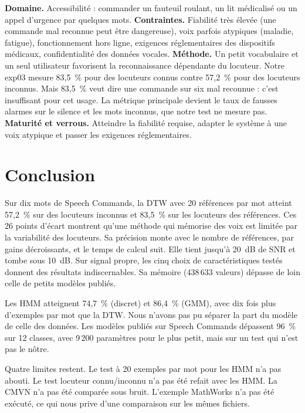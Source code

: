 \textbf{Domaine.} Accessibilité : commander un fauteuil roulant, un lit médicalisé ou un appel d'urgence par quelques mots. \textbf{Contraintes.} Fiabilité très élevée (une commande mal reconnue peut être dangereuse), voix parfois atypiques (maladie, fatigue), fonctionnement hors ligne, exigences réglementaires des dispositifs médicaux, confidentialité des données vocales. \textbf{Méthode.} Un petit vocabulaire et un seul utilisateur favorisent la reconnaissance dépendante du locuteur. Notre exp03 mesure 83,5~\% pour des locuteurs connus contre 57,2~\% pour des locuteurs inconnus. Mais 83,5~\% veut dire une commande sur six mal reconnue : c'est insuffisant pour cet usage. La métrique principale devient le taux de fausses alarmes sur le silence et les mots inconnus, que notre test ne mesure pas. \textbf{Maturité et verrous.} Atteindre la fiabilité requise, adapter le système à une voix atypique et passer les exigences réglementaires.

\section{Conclusion}

Sur dix mots de Speech Commands, la DTW avec 20 références par mot atteint 57,2~\% sur des locuteurs inconnus et 83,5~\% sur les locuteurs des références. Ces 26 points d'écart montrent qu'une méthode qui mémorise des voix est limitée par la variabilité des locuteurs. Sa précision monte avec le nombre de références, par gains décroissants, et le temps de calcul suit. Elle tient jusqu'à 20~dB de SNR et tombe sous 10~dB. Sur signal propre, les cinq choix de caractéristiques testés donnent des résultats indiscernables. Sa mémoire (438\,633 valeurs) dépasse de loin celle de petits modèles publiés.

Les HMM atteignent 74,7~\% (discret) et 86,4~\% (GMM), avec dix fois plus d'exemples par mot que la DTW. Nous n'avons pas pu séparer la part du modèle de celle des données. Les modèles publiés sur Speech Commands dépassent 96~\% sur 12 classes, avec 9\,200 paramètres pour le plus petit, mais sur un test qui n'est pas le nôtre.

Quatre limites restent. Le test à 20 exemples par mot pour les HMM n'a pas abouti. Le test locuteur connu/inconnu n'a pas été refait avec les HMM. La CMVN n'a pas été comparée sous bruit. L'exemple MathWorks n'a pas été exécuté, ce qui nous prive d'une comparaison sur les mêmes fichiers.
